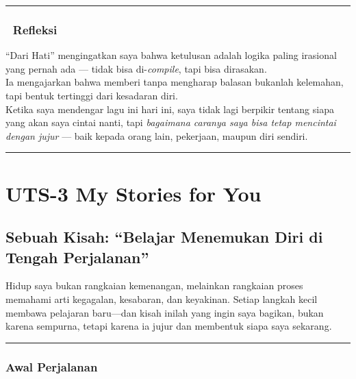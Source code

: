 \documentclass[
  letterpaper,
  DIV=11,
  numbers=noendperiod]{scrreprt}
\begin{document}
\begin{center}\rule{0.5\linewidth}{0.5pt}\end{center}

\subsection{💭 Refleksi}\label{refleksi}

``Dari Hati'' mengingatkan saya bahwa ketulusan adalah logika paling
irasional yang pernah ada --- tidak bisa di-\emph{compile}, tapi bisa
dirasakan.\\
Ia mengajarkan bahwa memberi tanpa mengharap balasan bukanlah kelemahan,
tapi bentuk tertinggi dari kesadaran diri.\\
Ketika saya mendengar lagu ini hari ini, saya tidak lagi berpikir
tentang siapa yang akan saya cintai nanti, tapi \emph{bagaimana caranya
saya bisa tetap mencintai dengan jujur} --- baik kepada orang lain,
pekerjaan, maupun diri sendiri.

\begin{center}\rule{0.5\linewidth}{0.5pt}\end{center}


\chapter{UTS-3 My Stories for You}\label{uts-3-my-stories-for-you}

\section{\texorpdfstring{\textbf{Sebuah Kisah: ``Belajar Menemukan Diri
di Tengah
Perjalanan''}}{Sebuah Kisah: ``Belajar Menemukan Diri di Tengah Perjalanan''}}\label{sebuah-kisah-belajar-menemukan-diri-di-tengah-perjalanan}

Hidup saya bukan rangkaian kemenangan, melainkan rangkaian proses
memahami arti kegagalan, kesabaran, dan keyakinan. Setiap langkah kecil
membawa pelajaran baru---dan kisah inilah yang ingin saya bagikan, bukan
karena sempurna, tetapi karena ia jujur dan membentuk siapa saya
sekarang.

\begin{center}\rule{0.5\linewidth}{0.5pt}\end{center}

\subsection{\texorpdfstring{\textbf{Awal
Perjalanan}}{Awal Perjalanan}}\label{awal-perjalanan}
\end{document}
